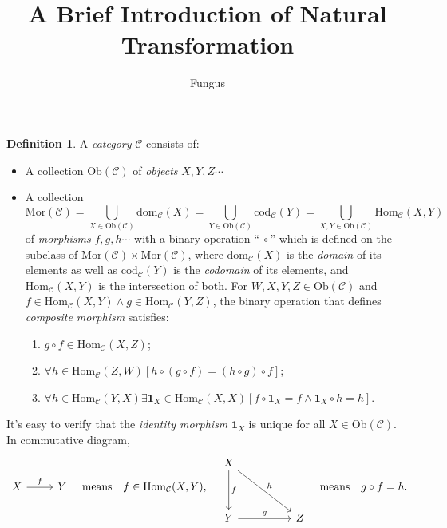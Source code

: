 \documentclass{article}
\title{A Brief Introduction of Natural Transformation}
\author{Fungus}
\begin{document}
\maketitle
\theoremstyle{definition}
\newtheorem{defi}{Definition}
\newtheorem{thm}{Theorem}
\newtheorem{lmm}{Lemma}
\newcommand\Ob{\mathrm{Ob}}
\newcommand\Mor{\mathrm{Mor}}
\newcommand\Hom{\mathrm{Hom}}
\newcommand\id{\mathrm{id}}
\newcommand\tid{\mathbf{id}}
\newcommand\C{\mathcal{C}}
\newcommand\D{\mathcal{D}}
\newcommand\1{\mathbf{1}}
\newcommand\iv{^{-1}}
\newcommand\equ{\mathop{\Rightarrow}\limits^{\sim}}

\begin{defi}\label{category}
	A \emph{category} $\C$ consists of:
	\begin{itemize}
		\item A collection $\Ob(\C)$ of \emph{objects} $X,Y,Z\cdots$
		\item A collection 
			$$\Mor(\C)=\bigcup_{X\in\Ob(\C)}{\mathrm{dom}_\C(X)}=\bigcup_{Y\in\Ob(\C)}{\mathrm{cod}_\C(Y)}=\bigcup_{X,Y\in\Ob(\C)}{\Hom_\C(X,Y)}$$
			of \emph{morphisms} $f,g,h\cdots$ with a binary operation ``$\ \circ$'' which is defined on the subclass of $\Mor(\C)\times\Mor(\C)$, where $\mathrm{dom}_\C(X)$ is the \emph{domain} of its elements as well as $\mathrm{cod}_\C(Y)$ is the \emph{codomain} of its elements, and $\Hom_\C(X,Y)$ is the intersection of both. For $W,X,Y,Z\in\Ob(\C)$ and $f\in\Hom_\C(X,Y)\wedge g\in\Hom_\C(Y,Z)$, the binary operation that defines \emph{composite morphism} satisfies:
			\begin{enumerate}
				\item $g\circ f\in\Hom_\C(X,Z)$;
				\item $\forall h\in\Hom_\C(Z,W)[h\circ(g\circ f)=(h\circ g)\circ f]$;
				\item $\forall h\in\Hom_\C(Y,X)\exists \1_X\in\Hom_\C(X,X)[f\circ\1_X=f\wedge\1_X\circ h=h]$.
			\end{enumerate}
	\end{itemize}
	
	It's easy to verify that the \emph{identity morphism} $\1_X$ is unique for all $X\in\Ob(\C)$.\\
	In commutative diagram,
	\[\begin{tikzcd}
			X\arrow[r,"f"] & Y
		\end{tikzcd}\quad\text{means}\quad f\in\Hom_\C(X,Y),\quad
		\begin{tikzcd}
			X\arrow[dd,"f"]\arrow[rrdd,"h"] & & \\ & & \\
			Y\arrow[rr,"g"] & & Z
		\end{tikzcd}\quad\text{means}\quad g\circ f=h.\]
\end{defi}
\end{document}
